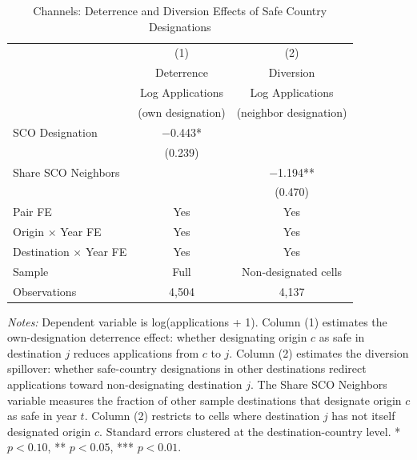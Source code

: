 \begin{table}[H]
\centering
\caption{Channels: Deterrence and Diversion Effects of Safe Country Designations}
\begin{threeparttable}
\begin{tabular}{lcc}
\toprule
 & (1) & (2) \\
 & Deterrence & Diversion \\
 & Log Applications & Log Applications \\
 & (own designation) & (neighbor designation) \\
\midrule
SCO Designation & $-$0.443* & \\
 & (0.239) & \\[0.5em]
Share SCO Neighbors & & $-$1.194** \\
 & & (0.470) \\[0.5em]
\midrule
Pair FE & Yes & Yes \\
Origin $\times$ Year FE & Yes & Yes \\
Destination $\times$ Year FE & Yes & Yes \\
Sample & Full & Non-designated cells \\[0.3em]
Observations & 4,504 & 4,137 \\
\bottomrule
\end{tabular}
\begin{tablenotes}[flushleft]
\small
\item \textit{Notes:} Dependent variable is log(applications + 1). Column (1) estimates the own-designation deterrence effect: whether designating origin $c$ as safe in destination $j$ reduces applications from $c$ to $j$. Column (2) estimates the diversion spillover: whether safe-country designations in other destinations redirect applications toward non-designating destination $j$. The Share SCO Neighbors variable measures the fraction of other sample destinations that designate origin $c$ as safe in year $t$. Column (2) restricts to cells where destination $j$ has not itself designated origin $c$. Standard errors clustered at the destination-country level. * $p<0.10$, ** $p<0.05$, *** $p<0.01$.
\end{tablenotes}
\end{threeparttable}
\label{tab:channels}
\end{table}
